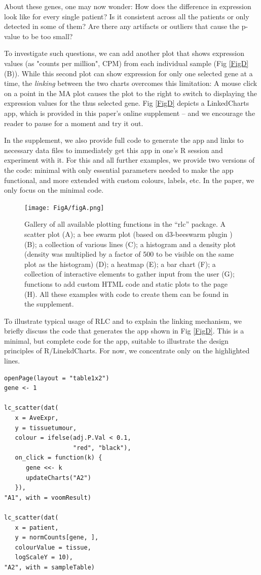 \documentclass[twocolumn,10pt]{article}
\begin{document}
About these genes, one may now wonder: How does the difference in expression look like for every single patient? Is it consistent across all the patients or only detected in some of them? Are there any artifacts or outliers that cause the p-value to be too small?

To investigate such questions, we can add another plot that shows expression values (as "counts per million", CPM) from each individual sample (Fig \ref{FigD}(B)). While this second plot can show expression for only one selected gene at a time, the \emph{linking} between the two charts  overcomes this limitation: A mouse click on a point in the MA plot causes the plot to the right to switch to displaying the expression values for the thus selected gene. Fig \ref{FigD} depicts a LinkedCharts app, which is provided in this paper's online supplement -- and we encourage the reader to pause for a moment and try it out. 

In the supplement, we also provide full code to generate the app and links to necessary data files to immediately get this app in one's R session and experiment with it. For this and all further examples, we provide two versions of the code: minimal with only essential parameters needed to make the app functional, and more extended with custom colours, labels, etc. In the paper, we only focus on the minimal code.

\begin{figure}[b]
	\texttt{[image: FigA/figA.png]}
	\caption{Gallery of all available plotting functions in the ``rlc'' package. A scatter plot (A); a bee swarm plot (based on d3-beeswarm plugin \citep{lebeau_2017}) (B); a collection of various lines (C); a histogram and a density plot (density was multiplied by a factor of 500 to be visible on the same plot as the histogram) (D); a heatmap (E); a bar chart (F); a collection of interactive elements to gather input from the user (G); functions to add custom HTML code and static plots to the page (H). All these examples with code to create them can be found in the supplement.}
	\label{FigA}
\end{figure}

To illustrate typical usage of RLC and to explain the linking mechanism, we briefly discuss the code that generates the app shown in Fig \ref{FigD}. This is a minimal, but complete code for the app, suitable to illustrate the design principles of R/LinekdCharts. For now, we concentrate only on the highlighted lines.

\begin{verbatim}
openPage(layout = "table1x2")
gene <- 1

lc_scatter(dat(
   x = AveExpr,
   y = tissuetumour,
   colour = ifelse(adj.P.Val < 0.1, 
                   "red", "black"),
   on_click = function(k) {
      gene <<- k
      updateCharts("A2")
   }),
"A1", with = voomResult)

lc_scatter(dat(
   x = patient,
   y = normCounts[gene, ],
   colourValue = tissue, 
   logScaleY = 10),
"A2", with = sampleTable)
\end{verbatim}
\end{document}
